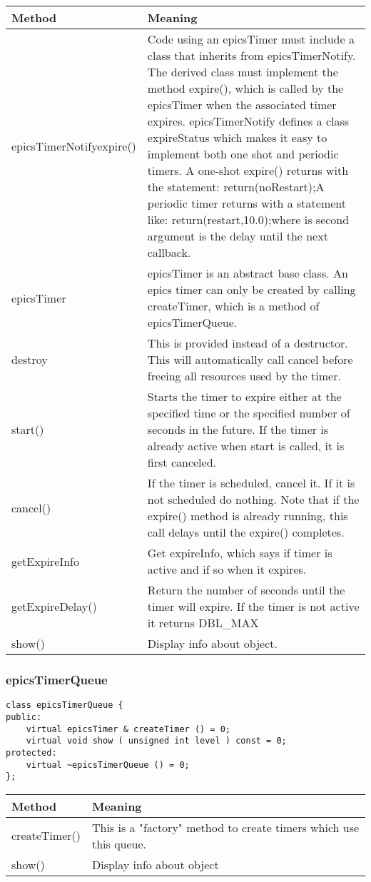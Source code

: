 \begin{center}\begin{longtable}{p{1.1in}p{5.0in}}
\textbf{Method} & \textbf{Meaning}\\
\hline
epicsTimerNotifyexpire() & Code using an epicsTimer must include a class that inherits from epicsTimerNotify. The derived class must implement the method expire(), which is called by the epicsTimer when the associated timer expires. epicsTimerNotify defines a class expireStatus which makes it easy to implement both one shot and periodic timers. A one-shot expire() returns with the statement:    return(noRestart);A periodic timer returns with a statement like:    return(restart,10.0);where is second argument is the delay until the next callback.\\
epicsTimer & epicsTimer is an abstract base class. An epics timer can only be created by calling createTimer, which is a method of epicsTimerQueue.\\
destroy & This is provided instead of a destructor. This will automatically call cancel before freeing all resources used by the timer.\\
start() & Starts the timer to expire either at the specified time or the specified number of seconds in the future. If the timer is already active when start is called, it is first canceled.\\
cancel() & If the timer is scheduled, cancel it. If it is not scheduled do nothing. Note that if the expire() method is already running, this call delays until the expire() completes.\\
getExpireInfo & Get expireInfo, which says if timer is active and if so when it expires.\\
getExpireDelay() & Return the number of seconds until the timer will expire. If the timer is not active it returns DBL\_MAX\\
show() & Display info about object.
\end{longtable}\end{center}


\subsubsection{epicsTimerQueue}

\begin{verbatim}class epicsTimerQueue {
public:
    virtual epicsTimer & createTimer () = 0;
    virtual void show ( unsigned int level ) const = 0;
protected:
    virtual ~epicsTimerQueue () = 0;
};\end{verbatim}
\begin{center}\begin{longtable}{p{1.1in}p{5.0in}}
\textbf{Method} & \textbf{Meaning}\\
\hline
createTimer() & This is a "factory" method to create timers which use this queue.\\
show() & Display info about object
\end{longtable}\end{center}


